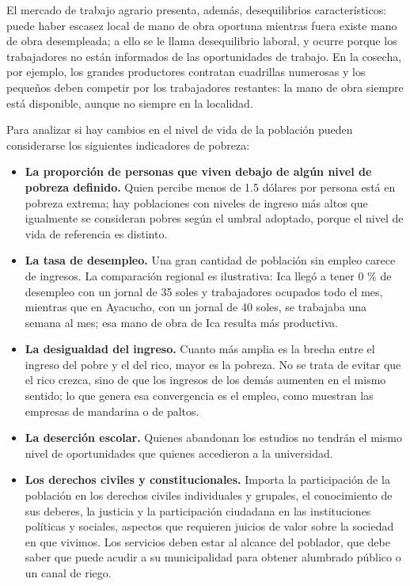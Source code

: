 \documentclass[
  man,
  floatsintext,
  longtable,
  a4paper,
  nolmodern,
  notxfonts,
  notimes,
  12pt,
  colorlinks=true,linkcolor=blue,citecolor=blue,urlcolor=blue]{apa7}
\begin{document}
El mercado de trabajo agrario presenta, además, desequilibrios
característicos: puede haber escasez local de mano de obra oportuna
mientras fuera existe mano de obra desempleada; a ello se le llama
desequilibrio laboral, y ocurre porque los trabajadores no están
informados de las oportunidades de trabajo. En la cosecha, por ejemplo,
los grandes productores contratan cuadrillas numerosas y los pequeños
deben competir por los trabajadores restantes: la mano de obra siempre
está disponible, aunque no siempre en la localidad.

Para analizar si hay cambios en el nivel de vida de la población pueden
considerarse los siguientes indicadores de pobreza:

\begin{itemize}
\item
  \textbf{La proporción de personas que viven debajo de algún nivel de
  pobreza definido.} Quien percibe menos de 1.5 dólares por persona está
  en pobreza extrema; hay poblaciones con niveles de ingreso más altos
  que igualmente se consideran pobres según el umbral adoptado, porque
  el nivel de vida de referencia es distinto.
\item
  \textbf{La tasa de desempleo.} Una gran cantidad de población sin
  empleo carece de ingresos. La comparación regional es ilustrativa: Ica
  llegó a tener 0 \% de desempleo con un jornal de 35 soles y
  trabajadores ocupados todo el mes, mientras que en Ayacucho, con un
  jornal de 40 soles, se trabajaba una semana al mes; esa mano de obra
  de Ica resulta más productiva.
\item
  \textbf{La desigualdad del ingreso.} Cuanto más amplia es la brecha
  entre el ingreso del pobre y el del rico, mayor es la pobreza. No se
  trata de evitar que el rico crezca, sino de que los ingresos de los
  demás aumenten en el mismo sentido; lo que genera esa convergencia es
  el empleo, como muestran las empresas de mandarina o de paltos.
\item
  \textbf{La deserción escolar.} Quienes abandonan los estudios no
  tendrán el mismo nivel de oportunidades que quienes accedieron a la
  universidad.
\item
  \textbf{Los derechos civiles y constitucionales.} Importa la
  participación de la población en los derechos civiles individuales y
  grupales, el conocimiento de sus deberes, la justicia y la
  participación ciudadana en las instituciones políticas y sociales,
  aspectos que requieren juicios de valor sobre la sociedad en que
  vivimos. Los servicios deben estar al alcance del poblador, que debe
  saber que puede acudir a su municipalidad para obtener alumbrado
  público o un canal de riego.
\end{itemize}
\end{document}
